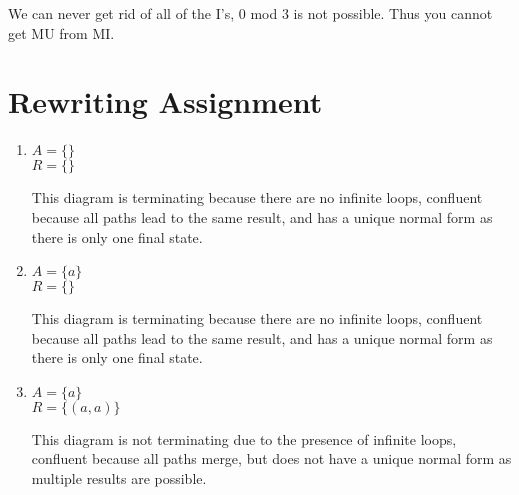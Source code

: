 \documentclass{article}
\begin{document}
We can never get rid of all of the I's, 0 mod 3 is not possible. Thus you cannot get MU from MI.

\newpage

\section{Rewriting Assignment}

\begin{enumerate}
    \item $A = \{ \}$ \\
    \hspace*{1em} $R = \{ \}$
    \begin{center}
        \end{center}
    This diagram is terminating because there are no infinite loops, confluent because all paths lead to the same result, and has a unique normal form as there is only one final state.

\vspace{4em}

    \item $A = \{ a \}$ \\
    \hspace*{1em} $R = \{ \}$
    \begin{center}
    \end{center}
    This diagram is terminating because there are no infinite loops, confluent because all paths lead to the same result, and has a unique normal form as there is only one final state.

\vspace{4em}

    \item $A = \{ a \}$ \\
    \hspace*{1em} $R = \{ (a,a) \}$
    \begin{center}
    \end{center}
    This diagram is not terminating due to the presence of infinite loops, confluent because all paths merge, but does not have a unique normal form as multiple results are possible.


\end{enumerate}
\end{document}
